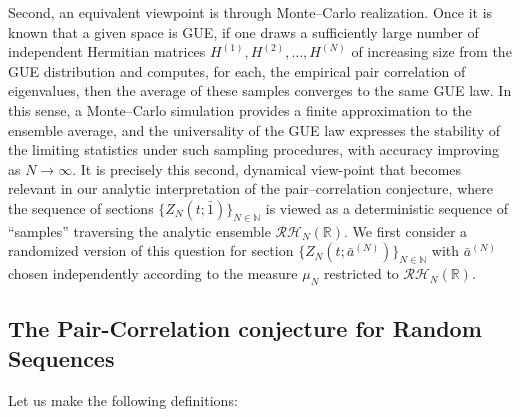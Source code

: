 \documentclass[12pt,reqno]{amsart}
\theoremstyle{plain}
\theoremstyle{definition}
\theoremstyle{remark}
\begin{document}
  
Second, an equivalent viewpoint is through Monte--Carlo realization.  
Once it is known that a given space is GUE, if one draws a sufficiently large number of independent Hermitian matrices 
$H^{(1)}, H^{(2)}, \ldots, H^{(N)}$ of increasing size from the GUE distribution and computes, for each, 
the empirical pair correlation of eigenvalues, then the average of these samples 
converges to the same GUE law. In this sense, a Monte--Carlo simulation provides a finite approximation to the ensemble average, 
and the universality of the GUE law expresses the stability of the limiting statistics 
under such sampling procedures, with accuracy improving as $N \rightarrow \infty$.  
It is precisely this second, dynamical view-point that becomes relevant in our analytic interpretation
of the pair--correlation conjecture, where the sequence of sections $\{Z_N(t;\bar 1)\}_{N \in \mathbb{N}}$ 
is viewed as a deterministic sequence of ``samples'' 
traversing the analytic ensemble $\mathcal{RH}_N(\mathbb{R})$. We first consider a randomized version of this question for section $\{Z_N(t;\bar a^{(N)})\}_{N \in \mathbb{N}}$ with $\bar a^{(N)}$ chosen independently according to the measure $\mu_N$ restricted to $\mathcal{RH}_N(\mathbb{R})$.  

\subsection{The Pair-Correlation conjecture for Random Sequences} Let us make the following definitions: 
\end{document}
